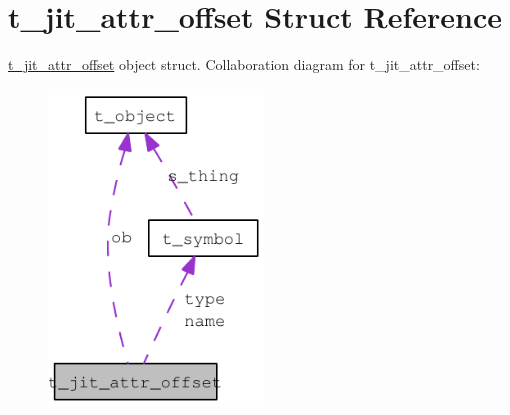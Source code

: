 \hypertarget{structt__jit__attr__offset}{
\section{t\_\-jit\_\-attr\_\-offset Struct Reference}
\label{structt__jit__attr__offset}
}


\hyperlink{structt__jit__attr__offset}{t\_\-jit\_\-attr\_\-offset} object struct.  
Collaboration diagram for t\_\-jit\_\-attr\_\-offset:\nopagebreak
\begin{figure}[H]
\begin{center}
\leavevmode
\includegraphics[width=163pt]{structt__jit__attr__offset__coll__graph}
\end{center}
\end{figure}
